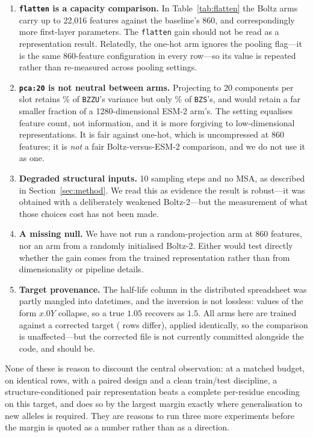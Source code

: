 \documentclass[11pt,a4paper]{article}
\newcommand{\armbzs}{\texttt{BZS}}
\newcommand{\armbzzu}{\texttt{BZZU}}
\begin{document}
\begin{enumerate}
        is itself a useful bound on environment-to-environment drift.
  \item \textbf{\texttt{flatten} is a capacity comparison.} In
        Table~\ref{tab:flatten} the Boltz arms carry up to 22{,}016 features
        against the baseline's 860, and correspondingly more first-layer
        parameters. The \texttt{flatten} gain should not be read as a
        representation result. Relatedly, the one-hot arm ignores the pooling
        flag---it is the same 860-feature configuration in every row---so its
        value is repeated rather than re-measured across pooling settings.
  \item \textbf{\texttt{pca:20} is not neutral between arms.} Projecting to 20
        components per slot retains \bzzuvariance{}\% of \armbzzu{}'s variance
        but only \bzsvariance{}\% of \armbzs{}'s, and would retain a far smaller
        fraction of a 1280-dimensional ESM-2 arm's. The setting equalises
        feature count, not information, and it is more forgiving to
        low-dimensional representations. It is fair against one-hot, which is
        uncompressed at 860 features; it is \emph{not} a fair
        Boltz-versus-ESM-2 comparison, and we do not use it as one.
  \item \textbf{Degraded structural inputs.} 10 sampling steps and no MSA, as
        described in Section~\ref{sec:method}. We read this as evidence the
        result is robust---it was obtained with a deliberately weakened
        Boltz-2---but the measurement of what those choices cost has not been
        made.
  \item \textbf{A missing null.} We have not run a random-projection arm at 860
        features, nor an arm from a randomly initialised Boltz-2. Either would
        test directly whether the gain comes from the trained representation
        rather than from dimensionality or pipeline details.
  \item \textbf{Target provenance.} The half-life column in the distributed
        spreadsheet was partly mangled into datetimes, and the inversion is not
        lossless: values of the form $x.0Y$ collapse, so a true $1.05$ recovers
        as $1.5$. All arms here are trained against a corrected target
        (\targetfixes{} rows differ), applied identically, so the comparison is
        unaffected---but the corrected file is not currently committed
        alongside the code, and should be.
\end{enumerate}

None of these is reason to discount the central observation: at a matched
budget, on identical rows, with a paired design and a clean train/test
discipline, a structure-conditioned pair representation beats a complete
per-residue encoding on this target, and does so by the largest margin exactly
where generalisation to new alleles is required. They are reasons to run three
more experiments before the margin is quoted as a number rather than as a
direction.



\end{document}
